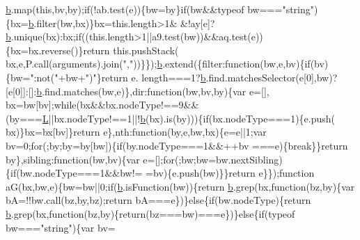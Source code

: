 \begin{DoxyCode}
      \hyperlink{jquery_8js_aa4026ad5544b958e54ce5e106fa1c805}{b}.map(\textcolor{keyword}{this},bv,by);\textcolor{keywordflow}{if}(!ab.test(e))\{bw=by\}\textcolor{keywordflow}{if}(bw&&typeof bw===\textcolor{stringliteral}{"string"})\{bx=\hyperlink{jquery_8js_aa4026ad5544b958e54ce5e106fa1c805}{b}.filter(bw,bx)\}bx=this.length>1&
      &!ay[e]?\hyperlink{jquery_8js_aa4026ad5544b958e54ce5e106fa1c805}{b}.unique(bx):bx;\textcolor{keywordflow}{if}((this.length>1||a9.test(bw))&&aq.test(e))\{bx=bx.reverse()\}\textcolor{keywordflow}{return} this.pushStack(
      bx,e,P.call(arguments).join(\textcolor{stringliteral}{","}))\}\});\hyperlink{jquery_8js_aa4026ad5544b958e54ce5e106fa1c805}{b}.extend(\{filter:\textcolor{keyword}{function}(bw,e,bv)\{\textcolor{keywordflow}{if}(bv)\{bw=\textcolor{stringliteral}{":not("}+bw+\textcolor{stringliteral}{")"}\}\textcolor{keywordflow}{return} e.
      length===1?\hyperlink{jquery_8js_aa4026ad5544b958e54ce5e106fa1c805}{b}.find.matchesSelector(e[0],bw)?[e[0]]:[]:\hyperlink{jquery_8js_aa4026ad5544b958e54ce5e106fa1c805}{b}.find.matches(bw,e)\},dir:\textcolor{keyword}{function}(bw,bv,by)\{var e=[],
      bx=bw[bv];\textcolor{keywordflow}{while}(bx&&bx.nodeType!==9&&(by===\hyperlink{jquery_8js_a38ee4c0b5f4fe2a18d0c783af540d253}{L}||bx.nodeType!==1||!\hyperlink{jquery_8js_aa4026ad5544b958e54ce5e106fa1c805}{b}(bx).is(by)))\{\textcolor{keywordflow}{if}(bx.nodeType===1)\{e.push(
      bx)\}bx=bx[bv]\}\textcolor{keywordflow}{return} e\},nth:\textcolor{keyword}{function}(by,e,bw,bx)\{e=e||1;var bv=0;\textcolor{keywordflow}{for}(;by;by=by[bw])\{\textcolor{keywordflow}{if}(by.nodeType===1&&++bv
      ===e)\{\textcolor{keywordflow}{break}\}\}\textcolor{keywordflow}{return} by\},sibling:\textcolor{keyword}{function}(bw,bv)\{var e=[];\textcolor{keywordflow}{for}(;bw;bw=bw.nextSibling)\{\textcolor{keywordflow}{if}(bw.nodeType===1&&bw!=
      =bv)\{e.push(bw)\}\}\textcolor{keywordflow}{return} e\}\});\textcolor{keyword}{function} aG(bx,bw,e)\{bw=bw||0;\textcolor{keywordflow}{if}(\hyperlink{jquery_8js_aa4026ad5544b958e54ce5e106fa1c805}{b}.isFunction(bw))\{\textcolor{keywordflow}{return} 
      \hyperlink{jquery_8js_aa4026ad5544b958e54ce5e106fa1c805}{b}.grep(bx,\textcolor{keyword}{function}(bz,by)\{var bA=!!bw.call(bz,by,bz);\textcolor{keywordflow}{return} bA===e\})\}\textcolor{keywordflow}{else}\{\textcolor{keywordflow}{if}(bw.nodeType)\{\textcolor{keywordflow}{return} 
      \hyperlink{jquery_8js_aa4026ad5544b958e54ce5e106fa1c805}{b}.grep(bx,\textcolor{keyword}{function}(bz,by)\{\textcolor{keywordflow}{return}(bz===bw)===e\})\}\textcolor{keywordflow}{else}\{\textcolor{keywordflow}{if}(typeof bw===\textcolor{stringliteral}{"string"})\{var bv=

\end{DoxyCode}
